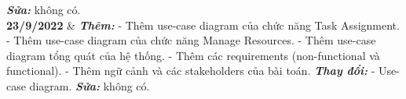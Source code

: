 \begin{tblr}
                            \textbf{\textit{Sửa:}} không có.\\
        \textbf{23/9/2022} & \textbf{\textit{Thêm:}}\newline
                            - Thêm use-case diagram của chức năng Task Assignment. \newline
                            - Thêm use-case diagram của chức năng Manage Resources. \newline
                            - Thêm use-case diagram tổng quát của hệ thống. \newline
                            - Thêm các requirements (non-functional và functional). \newline
                            - Thêm ngữ cảnh và các stakeholders của bài toán. \newline
                            \textbf{\textit{Thay đổi:}} \newline
                            - Use-case diagram. \newline
                            \textbf{\textit{Sửa:}} không có.\\
    \end{tblr}